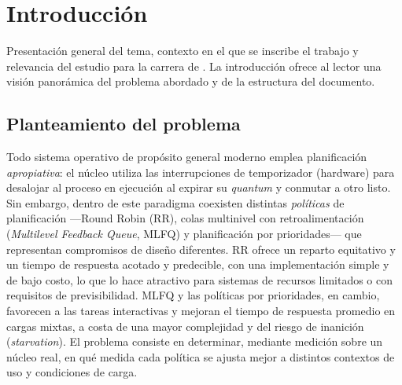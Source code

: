 \chapter{Introducción}
\label{cap:introduccion}


Presentación general del tema, contexto en el que se inscribe el trabajo y
relevancia del estudio para la carrera de \carreraTesis. La introducción ofrece
al lector una visión panorámica del problema abordado y de la estructura del
documento.

\section{Planteamiento del problema}

Todo sistema operativo de propósito general moderno emplea planificación
\emph{apropiativa}: el núcleo utiliza las interrupciones de temporizador
(hardware) para desalojar al proceso en ejecución al expirar su \emph{quantum} y
conmutar a otro listo. Sin embargo, dentro de este paradigma coexisten distintas
\emph{políticas} de planificación —Round Robin (RR), colas multinivel con
retroalimentación (\emph{Multilevel Feedback Queue}, MLFQ) y planificación por
prioridades— que representan compromisos de diseño diferentes. RR ofrece un
reparto equitativo y un tiempo de respuesta acotado y predecible, con una
implementación simple y de bajo costo, lo que lo hace atractivo para sistemas de
recursos limitados o con requisitos de previsibilidad. MLFQ y las políticas por
prioridades, en cambio, favorecen a las tareas interactivas y mejoran el tiempo
de respuesta promedio en cargas mixtas, a costa de una mayor complejidad y del
riesgo de inanición (\emph{starvation}). El problema consiste en determinar,
mediante medición sobre un núcleo real, en qué medida cada política se ajusta
mejor a distintos contextos de uso y condiciones de carga.

